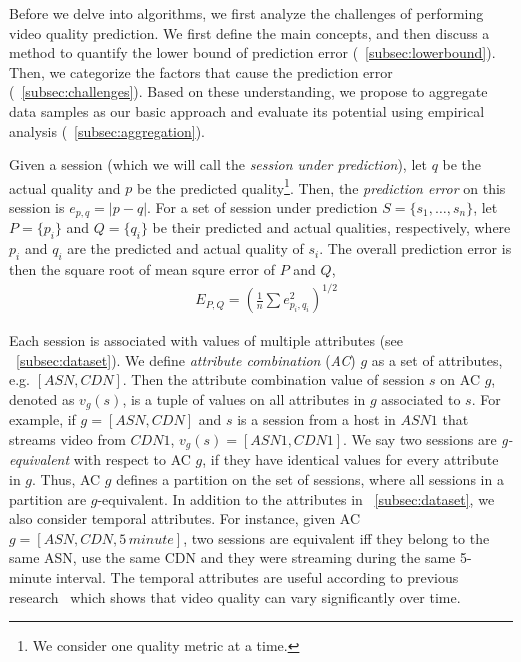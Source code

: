 \label{sec:challenges}


Before we delve into algorithms, we first analyze the challenges of performing video quality prediction. We first define the main concepts, and then discuss a method to quantify the lower bound of prediction error (\Section~\ref{subsec:lowerbound}). Then, we categorize the factors that cause the prediction error (\Section~\ref{subsec:challenges}). Based on these understanding, we propose to aggregate data samples as our basic approach and evaluate its potential using empirical analysis (\Section~\ref{subsec:aggregation}).


\label{subsec:lowerbound}


Given a session (which we will call the {\it session under
  prediction}), let $q$ be the actual quality and $p$ be the predicted
quality\footnote{We consider one quality metric at a time.}. Then, the
{\it prediction error} on this session is $e_{p,q}=|p-q|$.  For a set of
session under prediction $S=\{s_1,\dots,s_n\}$, let $P=\{p_i\}$ and
$Q=\{q_i\}$ be their predicted and actual qualities, respectively,
where $p_i$ and $q_i$ are the predicted and actual quality of
$s_i$. The overall prediction error is then the square root of mean
squre error of $P$ and $Q$,
\begin{align}
&E_{P,Q}=\left(\frac{1}{n}\sum e_{p_i,q_i}^2\right)^{1/2}
\end{align}

 Each session is associated
with values of multiple attributes (see
\Section~\ref{subsec:dataset}). We define {\it attribute combination}
({\it AC}) $g$ as a set of attributes, e.g. $[ASN, CDN]$. Then the
attribute combination value of session $s$ on AC $g$, denoted as
$v_g(s)$, is a tuple of values on all attributes in $g$ associated to
$s$. For example, if $g=[ASN,CDN]$ and $s$ is a session from a host in
$ASN1$ that streams video from $CDN1$, $v_g(s)=[ASN1, CDN1]$. We say
two sessions are {\it g-equivalent} with respect to AC $g$, if they
have identical values for every attribute in $g$. Thus, AC $g$ defines
a partition on the set of sessions, where all sessions in a partition
are $g$-equivalent. In addition to the attributes in
\Section~\ref{subsec:dataset}, we also consider temporal
attributes. For instance, given AC $g=[ASN, CDN, 5\,minute]$, two
sessions are equivalent iff they belong to the same ASN, use the same
CDN and they were streaming during the same 5-minute interval. The
temporal attributes are useful according to previous
research~\cite{sigcomm12} which shows that video quality can vary
significantly over time.

